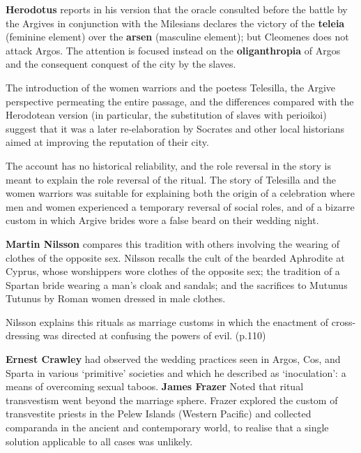 \textbf{Herodotus} reports in his version that the oracle consulted before the battle by the Argives in conjunction with the Milesians declares the victory of the \textbf{teleia} (feminine element) over the \textbf{arsen} (masculine element); but Cleomenes does not attack Argos. The attention is focused instead on the \textbf{oliganthropia} of Argos and the consequent conquest of the city by the slaves.

\begin{rmk}
    The introduction of the women warriors and the poetess Telesilla, the Argive perspective permeating the entire passage, and the differences compared with the Herodotean version (in particular, the substitution of slaves with perioikoi) suggest that it was a later re-elaboration by Socrates and other local historians aimed at improving the reputation of their city.
\end{rmk}

The account has no historical reliability, and the role reversal in the story is meant to explain the role reversal of the ritual. The story of Telesilla and the women warriors was suitable for explaining both the origin of a celebration where men and women experienced a temporary reversal of social roles, and of a bizarre custom in which Argive brides wore a false beard on their wedding night.

\textbf{Martin Nilsson} compares this tradition with others involving the wearing of clothes of the opposite sex. Nilsson recalls the cult of the bearded Aphrodite at Cyprus, whose worshippers wore clothes of the opposite sex; the tradition of a Spartan bride wearing a man's cloak and sandals; and the sacrifices to Mutunus Tutunus by Roman women dressed in male clothes.

\begin{nte}
    Nilsson explains this rituals as marriage customs in which the enactment of cross-dressing was directed at confusing the powers of evil. (p.110)
\end{nte}

\textbf{Ernest Crawley} had observed the wedding practices seen in Argos, Cos, and Sparta in various `primitive' societies and which he described as `inoculation': a means of overcoming sexual taboos. \textbf{James Frazer} Noted that ritual transvestism went beyond the marriage sphere. Frazer explored the custom of transvestite priests in the Pelew Islands (Western Pacific) and collected comparanda in the ancient and contemporary world, to realise that a single solution applicable to all cases was unlikely.

